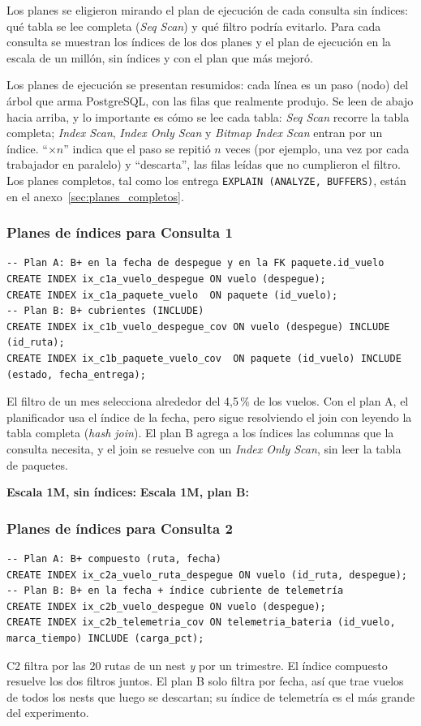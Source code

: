Los planes se eligieron mirando el plan de ejecución de cada consulta sin índices: qué tabla se lee completa (\emph{Seq Scan}) y qué filtro podría evitarlo. Para cada consulta se muestran los índices de los dos planes y el plan de ejecución en la escala de un millón, sin índices y con el plan que más mejoró.

Los planes de ejecución se presentan resumidos: cada línea es un paso (nodo) del árbol que arma PostgreSQL, con las filas que realmente produjo. Se leen de abajo hacia arriba, y lo importante es cómo se lee cada tabla: \emph{Seq Scan} recorre la tabla completa; \emph{Index Scan}, \emph{Index Only Scan} y \emph{Bitmap Index Scan} entran por un índice. ``$\times n$'' indica que el paso se repitió $n$ veces (por ejemplo, una vez por cada trabajador en paralelo) y ``descarta'', las filas leídas que no cumplieron el filtro. Los planes completos, tal como los entrega \texttt{EXPLAIN (ANALYZE, BUFFERS)}, están en el anexo~\ref{sec:planes_completos}.

\subsubsection{Planes de índices para Consulta 1}
\begin{lstlisting}[style=sql]
-- Plan A: B+ en la fecha de despegue y en la FK paquete.id_vuelo
CREATE INDEX ix_c1a_vuelo_despegue ON vuelo (despegue);
CREATE INDEX ix_c1a_paquete_vuelo  ON paquete (id_vuelo);
-- Plan B: B+ cubrientes (INCLUDE)
CREATE INDEX ix_c1b_vuelo_despegue_cov ON vuelo (despegue) INCLUDE (id_ruta);
CREATE INDEX ix_c1b_paquete_vuelo_cov  ON paquete (id_vuelo) INCLUDE (estado, fecha_entrega);
\end{lstlisting}
El filtro de un mes selecciona alrededor del 4,5\,\% de los vuelos. Con el plan A, el planificador usa el índice de la fecha, pero sigue resolviendo el join con  leyendo la tabla completa (\emph{hash join}). El plan B agrega a los índices las columnas que la consulta necesita, y el join se resuelve con un \emph{Index Only Scan}, sin leer la tabla de paquetes.

\noindent\textbf{Escala 1M, sin índices:}
\noindent\textbf{Escala 1M, plan B:}

\subsubsection{Planes de índices para Consulta 2}
\begin{lstlisting}[style=sql]
-- Plan A: B+ compuesto (ruta, fecha)
CREATE INDEX ix_c2a_vuelo_ruta_despegue ON vuelo (id_ruta, despegue);
-- Plan B: B+ en la fecha + índice cubriente de telemetría
CREATE INDEX ix_c2b_vuelo_despegue ON vuelo (despegue);
CREATE INDEX ix_c2b_telemetria_cov ON telemetria_bateria (id_vuelo, marca_tiempo) INCLUDE (carga_pct);
\end{lstlisting}
C2 filtra por las 20 rutas de un nest \emph{y} por un trimestre. El índice compuesto resuelve los dos filtros juntos. El plan B solo filtra por fecha, así que trae vuelos de todos los nests que luego se descartan; su índice de telemetría es el más grande del experimento.

